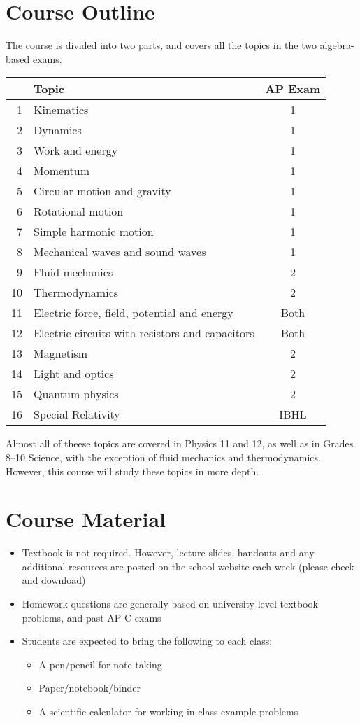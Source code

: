 \documentclass{../../oss-handout}
\begin{document}
\section*{Course Outline}
The course is divided into two parts, and covers all the topics in the two
algebra-based exams.
\begin{center}
  \begin{tabular}{rl|c}
    & \textbf{Topic} & \textbf{AP Exam}\\
    \hline
    1 & Kinematics & 1 \\
    2 & Dynamics   & 1 \\
    3 & Work and energy & 1 \\
    4 & Momentum   & 1 \\
    5 & Circular motion and gravity & 1 \\
    6 & Rotational motion & 1 \\
    7 & Simple harmonic motion & 1 \\
    8 & Mechanical waves and sound waves & 1 \\
    9 & Fluid mechanics & 2 \\
    10 & Thermodynamics & 2 \\
    11 & Electric force, field, potential and energy & Both \\
    12 & Electric circuits with resistors and capacitors & Both \\
    13 & Magnetism & 2 \\
    14 & Light and optics & 2 \\
    15 & Quantum physics & 2 \\
    16 & Special Relativity & IBHL
  \end{tabular}
\end{center}
Almost all of theese topics are covered in Physics 11 and 12, as well as in
Grades 8--10 Science, with the exception of fluid mechanics and thermodynamics.
However, this course will study these topics in more depth.

\section*{Course Material}
\begin{itemize}[nosep]
\item Textbook is not required. However, lecture slides, handouts and any
  additional resources are posted on the school website each week (please check
  and download)
\item Homework questions are generally based on university-level textbook
  problems, and past AP C exams
\item Students are expected to bring the following to each class:
  \begin{itemize}[nosep]
  \item A pen/pencil for note-taking
  \item Paper/notebook/binder
  \item A scientific calculator for working in-class example problems
  \end{itemize}
\end{itemize}
\end{document}

